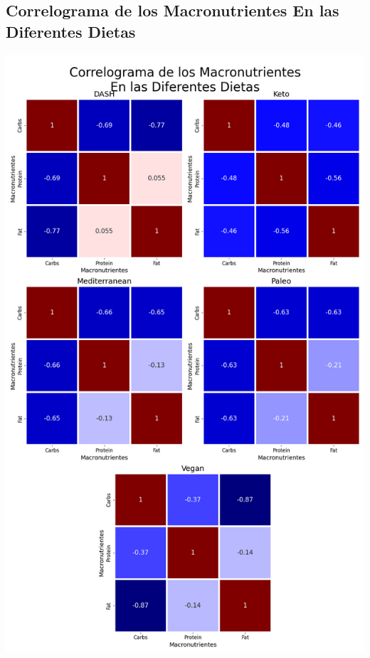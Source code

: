 \documentclass[12pt,a4paper]{article}
\begin{document}
{{            \subsection{Correlograma de los Macronutrientes En las Diferentes Dietas}\label{anexo:B.1}
            {
                \begin{center}
                   \includegraphics[height=0.9\textheight]{Resources/Bivariado/Correlation.png}
                \end{center}
            }
        }
    }
        
    \newpage
    
    {
        \printbibliography[heading=bibintoc,title={Referencias Bibliográficas}]
    }
\end{document}
